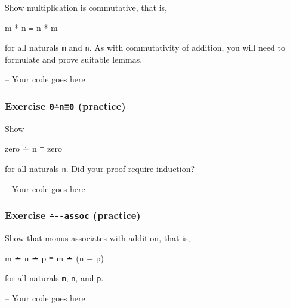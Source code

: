 Show multiplication is commutative, that is,

\begin{myDisplay}
m * n ≡ n * m
\end{myDisplay}

for all naturals \texttt{m} and \texttt{n}. As with commutativity of
addition, you will need to formulate and prove suitable lemmas.

\begin{fence}
\begin{code}
-- Your code goes here
\end{code}
\end{fence}

\hypertarget{Induction-zero-monus}{%
\subsubsection{\texorpdfstring{Exercise \texttt{0∸n≡0}
(practice)}{Exercise 0∸n≡0 (practice)}}\label{Induction-zero-monus}}

Show

\begin{myDisplay}
zero ∸ n ≡ zero
\end{myDisplay}

for all naturals \texttt{n}. Did your proof require induction?

\begin{fence}
\begin{code}
-- Your code goes here
\end{code}
\end{fence}

\hypertarget{Induction-monus-plus-assoc}{%
\subsubsection{\texorpdfstring{Exercise \texttt{∸-\textbar{}-assoc}
(practice)}{Exercise ∸-\textbar-assoc (practice)}}\label{Induction-monus-plus-assoc}}

Show that monus associates with addition, that is,

\begin{myDisplay}
m ∸ n ∸ p ≡ m ∸ (n + p)
\end{myDisplay}

for all naturals \texttt{m}, \texttt{n}, and \texttt{p}.

\begin{fence}
\begin{code}
-- Your code goes here
\end{code}
\end{fence}

